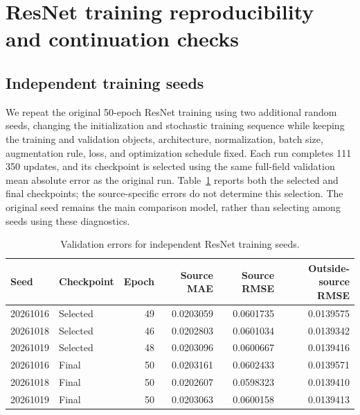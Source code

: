 \section{ResNet training reproducibility and continuation checks}
\label{app:resnet_checks}

\subsection{Independent training seeds}

We repeat the original 50-epoch ResNet training using two additional random seeds, changing the initialization and stochastic training sequence while keeping the training and validation objects, architecture, normalization, batch size, augmentation rule, loss, and optimization schedule fixed.
Each run completes 111\,350 updates, and its checkpoint is selected using the same full-field validation mean absolute error as the original run.
Table~\ref{tab:resnet_seeds} reports both the selected and final checkpoints; the source-specific errors do not determine this selection.
The original seed remains the main comparison model, rather than selecting among seeds using these diagnostics.

\begin{table}[t]
    \centering
    \caption{Validation errors for independent ResNet training seeds.}
    \label{tab:resnet_seeds}
    \begin{tabular}{llrrrr}
        \hline\hline
        Seed & Checkpoint & Epoch & Source MAE & Source RMSE & Outside-source RMSE \\
        \hline
        20261016 & Selected & 49 & 0.0203059 & 0.0601735 & 0.0139575 \\
        20261018 & Selected & 46 & 0.0202803 & 0.0601034 & 0.0139342 \\
        20261019 & Selected & 48 & 0.0203096 & 0.0600667 & 0.0139416 \\
        \hline
        20261016 & Final & 50 & 0.0203161 & 0.0602433 & 0.0139571 \\
        20261018 & Final & 50 & 0.0202607 & 0.0598323 & 0.0139410 \\
        20261019 & Final & 50 & 0.0203063 & 0.0600158 & 0.0139413 \\
        \hline
    \end{tabular}
\end{table}

